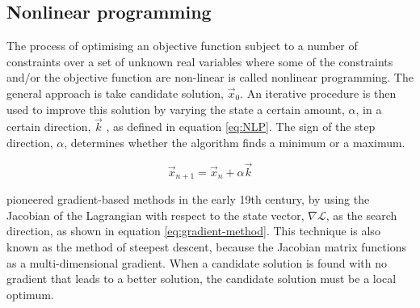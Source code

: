 



\subsection{Nonlinear programming} \label{sub:NLP}

The process of optimising an objective function subject to a number of constraints over a set of unknown real variables where some of the constraints and/or the objective function are non-linear is called nonlinear programming. The general approach is take candidate solution, $\vec{x}_0$. An iterative procedure is then used to improve this solution by varying the state a certain amount, $\alpha$, in a certain direction, $\vec{k}$ \parencite{Betts1998}, as defined in equation \eqref{eq:NLP}. The sign of the step direction, $\alpha$, determines whether the algorithm finds a minimum or a maximum.

\begin{equation} \label{eq:NLP}
\vec{x}_{n+1}=\vec{x}_n+\alpha\vec{k}
\end{equation}

\textcite{Gauss1827} pioneered gradient-based methods in the early 19th century, by using the Jacobian of the Lagrangian with respect to the state vector, $\nabla\mathcal{L}$, as the search direction, as shown in equation \eqref{eq:gradient-method}. This technique is also known as the method of steepest descent, because the Jacobian matrix functions as a multi-dimensional gradient. When a candidate solution is found with no gradient that leads to a better solution, the candidate solution must be a local optimum.

